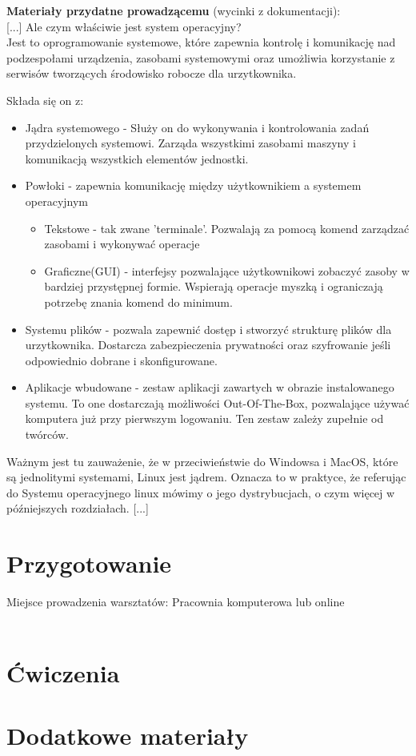 \documentclass[10pt,a4paper]{article}
\begin{document}
\textbf{Materiały przydatne prowadzącemu} (wycinki z dokumentacji): \\

[...] Ale czym właściwie jest system operacyjny?\\

Jest to oprogramowanie systemowe, które zapewnia kontrolę i komunikację nad podzespołami urządzenia, zasobami systemowymi oraz umożliwia korzystanie z serwisów tworzących środowisko robocze dla urzytkownika.

Składa się on z:
\begin{itemize}
\item Jądra systemowego - Służy on do wykonywania i kontrolowania zadań przydzielonych systemowi. Zarząda wszystkimi zasobami maszyny i komunikacją wszystkich elementów jednostki.
\item Powłoki - zapewnia komunikację między użytkownikiem a systemem operacyjnym

\begin{itemize}
\item Tekstowe - tak zwane 'terminale'. Pozwalają za pomocą komend zarządzać zasobami i wykonywać operacje
\item Graficzne(GUI) - interfejsy pozwalające użytkownikowi zobaczyć zasoby w bardziej przystępnej formie. Wspierają operacje myszką i ograniczają potrzebę znania komend do minimum.
\end{itemize}

\item Systemu plików - pozwala zapewnić dostęp i stworzyć strukturę plików dla urzytkownika. Dostarcza zabezpieczenia prywatności oraz szyfrowanie jeśli odpowiednio dobrane i skonfigurowane.
\item Aplikacje wbudowane - zestaw aplikacji zawartych w obrazie instalowanego systemu. To one dostarczają możliwości Out-Of-The-Box, pozwalające używać komputera już przy pierwszym logowaniu. Ten zestaw zależy zupełnie od twórców.
\end{itemize}
	
Ważnym jest tu zauważenie, że w przeciwieństwie do Windowsa i MacOS, które są jednolitymi systemami, Linux jest jądrem. Oznacza to w praktyce, że referując do Systemu operacyjnego linux mówimy o jego dystrybucjach, o czym więcej w późniejszych rozdziałach. [...]

\section{Przygotowanie}

Miejsce prowadzenia warsztatów: Pracownia komputerowa lub online \\\\


\section{Ćwiczenia}

\section{Dodatkowe materiały}
\end{document}
